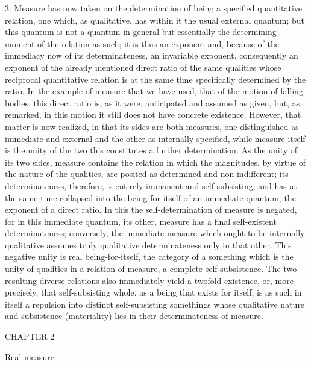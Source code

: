 3. Measure has now taken on the determination
of being a specified quantitative relation,
one which, as qualitative, has within it the usual external quantum;
but this quantum is not a quantum in general
but essentially the determining moment
of the relation as such;
it is thus an exponent and,
because of the immediacy now of its determinateness,
an invariable exponent, consequently an exponent
of the already mentioned direct ratio
of the same qualities whose reciprocal quantitative relation is
at the same time specifically determined by the ratio.
In the example of measure that we have used,
that of the motion of falling bodies,
this direct ratio is, as it were,
anticipated and assumed as given,
but, as remarked, in this motion it still
does not have concrete existence.
However, that matter is now realized,
in that its sides are both measures,
one distinguished as immediate and external
and the other as internally specified,
while measure itself is the unity of the two
this constitutes a further determination.
As the unity of its two sides,
measure contains the relation in which the magnitudes,
by virtue of the nature of the qualities,
are posited as determined and non-indifferent;
its determinateness, therefore, is entirely immanent and self-subsisting,
and has at the same time collapsed into the being-for-itself
of an immediate quantum, the exponent of a direct ratio.
In this the self-determination of measure is negated,
for in this immediate quantum,
its other, measure has a final self-existent determinateness;
conversely, the immediate measure
which ought to be internally qualitative
assumes truly qualitative determinateness only in that other.
This negative unity is real being-for-itself,
the category of a something which is the unity of qualities
in a relation of measure, a complete self-subsistence.
The two resulting diverse relations also
immediately yield a twofold existence,
or, more precisely, that self-subsisting whole,
as a being that exists for itself, is as such in itself
a repulsion into distinct self-subsisting
somethings whose qualitative nature
and subsistence (materiality) lies
in their determinateness of measure.

CHAPTER 2

Real measure

